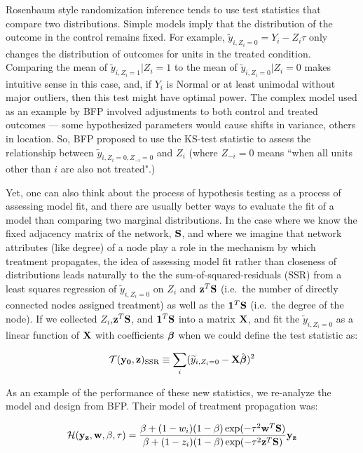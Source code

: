 Rosenbaum style randomization inference tends to use test statistics that
compare two distributions. Simple models imply that the distribution of the
outcome in the control remains fixed. For example, $\widetilde
y_{i,Z_i=0}=Y_i-Z_i \tau$ only changes the distribution of outcomes for units
in the treated condition. Comparing the mean of $\widetilde y_{i,Z_i=1}|Z_i=1$
to the mean of $\widetilde y_{i,Z_i=0}|Z_i=0$ makes intuitive sense in this
case, and, if $Y_i$ is Normal or at least unimodal without major outliers,
then this test might have optimal power. The complex model used as an example
by BFP involved adjustments to both control and treated outcomes --- some
hypothesized parameters would cause shifts in variance, others in location.
So, BFP proposed to use the KS-test statistic to assess the relationship
between $\widetilde y_{i,Z_i=0,Z_{-i}=0}$ and $Z_i$ (where $Z_{-i}=0$ means
``when all units other than $i$ are also not treated".)

Yet, one can also think about the process of hypothesis testing as a process
of assessing model fit, and there are usually better ways to evaluate the fit
of a model than comparing two marginal distributions. In the case where we know
the fixed adjacency matrix of the network, $\mathbf{S}$, and where we imagine that
network attributes (like degree) of a node play a role in the mechanism by
which treatment propagates, the idea of assessing model fit rather than
closeness of distributions leads naturally to the the sum-of-squared-residuals
(SSR) from a least squares regression of $ \widetilde y_{i,Z_i=0}$ on $Z_{i}$ and
$\mathbf{z}^{T} \mathbf{S}$ (i.e.\ the number of directly connected nodes assigned treatment)
as well as the $\mathbf{1}^{T} \mathbf{S}$ (i.e.\ the degree of the node). If we
collected $Z_{i}$,$\mathbf{z}^{T} \mathbf{S}$, and $\mathbf{1}^{T} \mathbf{S}$ into a matrix $\mathbf{X}$,
and fit the $\widetilde y_{i,Z_i=0}$ as a linear function of $\mathbf{X}$ with
coefficients $\boldsymbol{\beta}$ when we could define the test statistic as:


\begin{equation}
 \mathcal{T}(\mathbf{y}_{\mathbf{0}},\mathbf{z})_{\text{SSR}} \equiv \sum_{i} ( \widetilde y_{i,Z_i=0} -
 \mathbf{X}\hat{\boldsymbol{\beta}}) ^2 \label{eq:ssr}
\end{equation}

As an example of the performance of these new statistics, we re-analyze the
model and design from BFP. Their model of treatment propagation
was:

\begin{equation}
\mathcal{H}(\mathbf{y}_{\mathbf{z}}, \mathbf{w}, \beta, \tau) =
 \frac{\beta + (1 - w_i) (1 - \beta) \exp(- \tau^2 \mathbf{w}^{T} \mathbf{S})}
      {\beta + (1 - z_i) (1 - \beta) \exp(- \tau^2 \mathbf{z}^{T} \mathbf{S})} \mathbf{y}_{\mathbf{z}}
\label{eq:spillovermodelA}
\end{equation}

